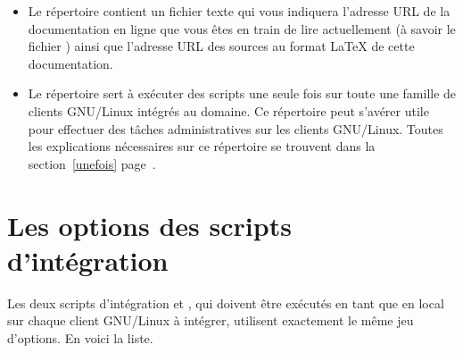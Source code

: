 \begin{itemize}
\item Le répertoire  contient un fichier
texte qui vous indiquera l'adresse URL de la documentation
en ligne que vous êtes en train
de lire actuellement (à savoir le fichier )
ainsi que l'adresse URL
des sources au format \LaTeX{} de cette documentation.


\item Le répertoire  sert à exécuter des scripts
une seule fois sur toute une \og famille \fg{} de clients
GNU/Linux intégrés au domaine. Ce répertoire peut s'avérer utile pour
effectuer des tâches administratives sur les clients GNU/Linux.
Toutes les explications nécessaires sur ce répertoire
se trouvent dans la section~\ref{unefois} page~\pageref{unefois}.


\end{itemize}





\section{Les options des scripts d'intégration}
\label{options-integration}

Les deux scripts d'intégration  et
, qui doivent être exécutés en
tant que  en local sur chaque client GNU/Linux à intégrer, 
utilisent exactement le même jeu d'options. En voici la liste.



